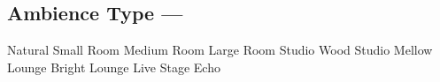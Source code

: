 \subsection[Ambience Type]{Ambience Type --- \UiKey{\SET}}









































Natural
Small Room
Medium Room
Large Room
Studio
Wood Studio
Mellow Lounge
Bright Lounge
Live Stage
Echo
